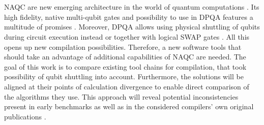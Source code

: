 \chapter{\abstractname}
\ac{NAQC} are new emerging architecture in the world of quantum computations \parencite{Schmid_2024_NeutralAtomBasics}. 
Its high fidelity, native multi-qubit gates and possibility to use in \ac{DPQA} features a multitude of promises \parencite{Levine_2019, Schmid_2024_NeutralAtomBasics, Wintersperger_2023}.
Moreover, \ac{DPQA} allows using physical shuttling of qubits during circuit execution instead or together with logical SWAP gates \parencite{Tan_2025_Enola, Schmid_2024_NeutralAtomBasics}. 
All this opens up new compilation possibilities. 
Therefore, a new software tools that should take an advantage of additional capabilities of \ac{NAQC} are needed.
The goal of this work is to compare existing tool chains for compilation, that took possibility of qubit shuttling into account.
Furthermore, the solutions will be aligned at their points of calculation divergence to enable direct comparison of the algorithms they use. 
This approach will reveal potential inconsistencies present in early benchmarks 
as well as in the considered compilers' own original publications
\parencite{schmid2023hybridcircuitmappingleveraging, Tan_2025_Enola, huang2025dasatomdivideandshuttleatomapproach, gao2025optimalcompilationstrategiesqft}.
